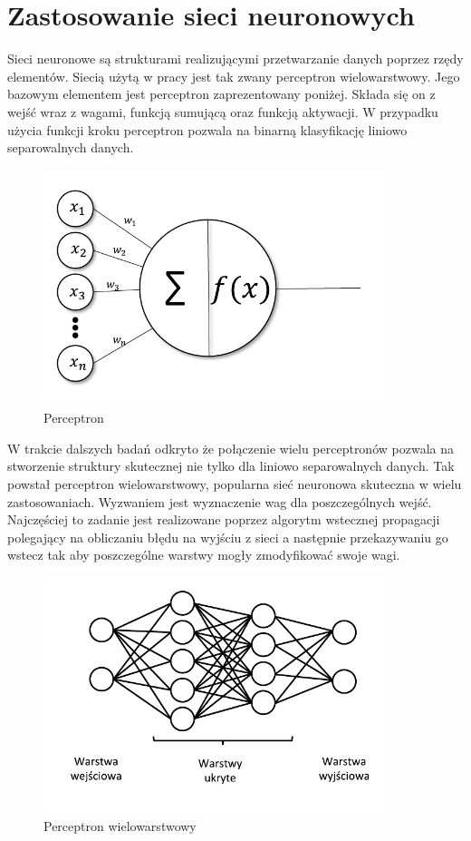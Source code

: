 \documentclass[inzynierska]{pwr_wmat_praca_dyplomowa}
\theoremstyle{plain}
\numberwithin{theorem}{chapter}
\theoremstyle{definition}
\numberwithin{theorem}{chapter}
\begin{document}
\section{Zastosowanie sieci neuronowych}

Sieci neuronowe są strukturami realizującymi przetwarzanie danych poprzez rzędy elementów. Siecią użytą w pracy jest tak zwany perceptron wielowarstwowy. Jego bazowym elementem jest perceptron zaprezentowany poniżej. Składa się on z wejść wraz z wagami, funkcją sumującą oraz funkcją aktywacji. W przypadku użycia funkcji kroku perceptron pozwala na binarną klasyfikację liniowo separowalnych danych. 
\begin{figure}[ht]
	\centering
	\includegraphics[width=10cm]{images/perceptron_c.pdf}
	\caption{Perceptron}
	\label{perceptron}
\end{figure}
W trakcie dalszych badań odkryto że połączenie wielu perceptronów pozwala na stworzenie struktury skutecznej nie tylko dla liniowo separowalnych danych. Tak powstał perceptron wielowarstwowy, popularna sieć neuronowa skuteczna w wielu zastosowaniach. Wyzwaniem jest wyznaczenie wag dla poszczególnych wejść. Najczęściej to zadanie jest realizowane poprzez algorytm wstecznej propagacji polegający na obliczaniu błędu na wyjściu z sieci a następnie przekazywaniu go wstecz tak aby poszczególne warstwy mogły zmodyfikować swoje wagi. 
\begin{figure}[ht]
	\centering
	\includegraphics[width=10cm]{images/siec_c.pdf}
	\caption{Perceptron wielowarstwowy}
	\label{mlp}
\end{figure}
\end{document}
